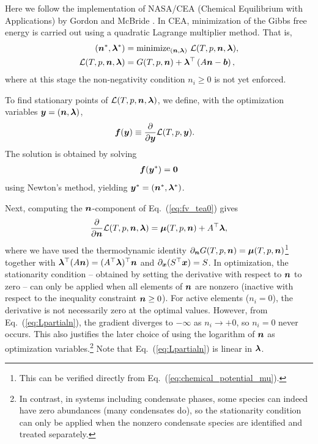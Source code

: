 Here we follow the implementation of NASA/CEA (Chemical Equilibrium with Applications) by Gordon and McBride \cite{gordon1994computer,2024arXiv241207166G}. In CEA, minimization of the Gibbs free energy is carried out using a quadratic Lagrange multiplier method. That is,
\begin{align}
    (\boldsymbol{n}^\ast, \boldsymbol{\lambda}^\ast)  &= \mathrm{minimize}_{(\boldsymbol{n},\boldsymbol{\lambda})} \,\, \mathcal{L}(T, p, \boldsymbol{n}, \boldsymbol{\lambda}), \\
    \mathcal{L}(T, p, \boldsymbol{n},\boldsymbol{\lambda}) &= G(T, p, \boldsymbol{n}) + \boldsymbol{\lambda}^\top \left(A \boldsymbol{n} - \boldsymbol{b}\right),
\end{align}
where at this stage the non-negativity condition $n_i \ge 0$ is not yet enforced.

To find stationary points of $\mathcal{L}(T, p, \boldsymbol{n}, \boldsymbol{\lambda})$, we define, with the optimization variables $\boldsymbol{y} = (\boldsymbol{n}, \boldsymbol{\lambda})$,
\begin{align}
\label{eq:fv_tea0}
    \boldsymbol{f}(\boldsymbol{y}) &\equiv \frac{\partial}{\partial \boldsymbol{y}} \mathcal{L}(T, p, \boldsymbol{y}).
\end{align}
The solution is obtained by solving
\begin{align}
    \label{eq:fv_tea}
    \boldsymbol{f}(\boldsymbol{y}^\ast) = \boldsymbol{0}
\end{align}
using Newton’s method, yielding $\boldsymbol{y}^\ast = (\boldsymbol{n}^\ast, \boldsymbol{\lambda}^\ast)$.  

Next, computing the $\boldsymbol{n}$-component of Eq.~(\ref{eq:fv_tea0}) gives
\begin{align}
\label{eq:Lpartialn}
    \frac{\partial}{\partial \boldsymbol{n}}   \mathcal{L}(T, p, \boldsymbol{n}, \boldsymbol{\lambda}) =  \boldsymbol{\mu} (T, p, \boldsymbol{n}) + A^\top \boldsymbol{\lambda},
\end{align}
where we have used the thermodynamic identity $\partial_{\boldsymbol{n}} G(T, p, \boldsymbol{n}) =  \boldsymbol{\mu} (T, p, \boldsymbol{n})$\footnote{This can be verified directly from Eq.~(\ref{eq:chemical_potential_mu}).} together with $\boldsymbol{\lambda}^\top (A \boldsymbol{n}) = (A^\top \boldsymbol{\lambda})^\top \boldsymbol{n}$ and $\partial_{\boldsymbol{x}} (S^\top \boldsymbol{x}) = S$.   In optimization, the stationarity condition -- obtained by setting the derivative with respect to $\boldsymbol{n}$ to zero -- can only be applied when all elements of $\boldsymbol{n}$ are nonzero (inactive with respect to the inequality constraint $\boldsymbol{n} \ge 0$). For active elements ($n_i = 0$), the derivative is not necessarily zero at the optimal values. However, from Eq.~(\ref{eq:Lpartialn}), the gradient diverges to $-\infty$ as $n_i \to +0$, so $n_i = 0$ never occurs. This also justifies the later choice of using the logarithm of $\boldsymbol{n}$ as optimization variables.\footnote{In contrast, in systems including condensate phases, some species can indeed have zero abundances (many condensates do), so the stationarity condition can only be applied when the nonzero condensate species are identified and treated separately.} 
Note that Eq.~(\ref{eq:Lpartialn}) is linear in $\boldsymbol{\lambda}$.  

